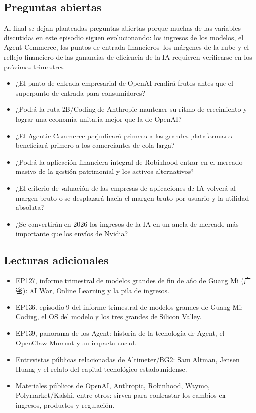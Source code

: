 \subsection{Preguntas abiertas}

Al final se dejan planteadas preguntas abiertas porque muchas de las variables discutidas en este episodio siguen evolucionando: los ingresos de los modelos, el Agent Commerce, los puntos de entrada financieros, los márgenes de la nube y el reflejo financiero de las ganancias de eficiencia de la IA requieren verificarse en los próximos trimestres.

\begin{itemize}
\item ¿El punto de entrada empresarial de OpenAI rendirá frutos antes que el superpunto de entrada para consumidores?
\item ¿Podrá la ruta 2B/Coding de Anthropic mantener su ritmo de crecimiento y lograr una economía unitaria mejor que la de OpenAI?
\item ¿El Agentic Commerce perjudicará primero a las grandes plataformas o beneficiará primero a los comerciantes de cola larga?
\item ¿Podrá la aplicación financiera integral de Robinhood entrar en el mercado masivo de la gestión patrimonial y los activos alternativos?
\item ¿El criterio de valuación de las empresas de aplicaciones de IA volverá al margen bruto o se desplazará hacia el margen bruto por usuario y la utilidad absoluta?
\item ¿Se convertirán en 2026 los ingresos de la IA en un ancla de mercado más importante que los envíos de Nvidia?
\end{itemize}

\subsection{Lecturas adicionales}

\begin{itemize}
\item EP127, informe trimestral de modelos grandes de fin de año de Guang Mi (广密): AI War, Online Learning y la pila de ingresos.
\item EP136, episodio 9 del informe trimestral de modelos grandes de Guang Mi: Coding, el OS del modelo y los tres grandes de Silicon Valley.
\item EP139, panorama de los Agent: historia de la tecnología de Agent, el OpenClaw Moment y su impacto social.
\item Entrevistas públicas relacionadas de Altimeter/BG2: Sam Altman, Jensen Huang y el relato del capital tecnológico estadounidense.
\item Materiales públicos de OpenAI, Anthropic, Robinhood, Waymo, Polymarket/Kalshi, entre otros: sirven para contrastar los cambios en ingresos, productos y regulación.
\end{itemize}

